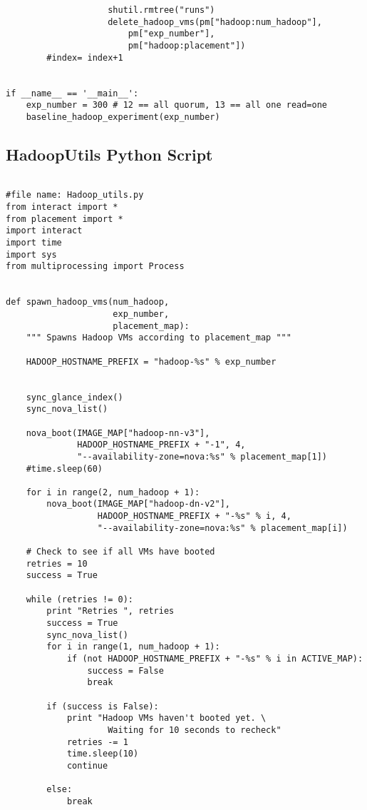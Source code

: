 \begin{verbatim}
                    shutil.rmtree("runs")
                    delete_hadoop_vms(pm["hadoop:num_hadoop"],
                        pm["exp_number"],
                        pm["hadoop:placement"])
        #index= index+1

 
if __name__ == '__main__':
    exp_number = 300 # 12 == all quorum, 13 == all one read=one
    baseline_hadoop_experiment(exp_number)

\end{verbatim}

\subsection{HadoopUtils Python Script}

\begin{verbatim}

#file name: Hadoop_utils.py
from interact import *
from placement import *
import interact
import time
import sys
from multiprocessing import Process


def spawn_hadoop_vms(num_hadoop,
                     exp_number,
                     placement_map):
    """ Spawns Hadoop VMs according to placement_map """

    HADOOP_HOSTNAME_PREFIX = "hadoop-%s" % exp_number


    sync_glance_index()
    sync_nova_list()

    nova_boot(IMAGE_MAP["hadoop-nn-v3"],
              HADOOP_HOSTNAME_PREFIX + "-1", 4,
              "--availability-zone=nova:%s" % placement_map[1])
    #time.sleep(60)

    for i in range(2, num_hadoop + 1):
        nova_boot(IMAGE_MAP["hadoop-dn-v2"],
                  HADOOP_HOSTNAME_PREFIX + "-%s" % i, 4,
                  "--availability-zone=nova:%s" % placement_map[i])

    # Check to see if all VMs have booted
    retries = 10
    success = True

    while (retries != 0):
        print "Retries ", retries
        success = True
        sync_nova_list()
        for i in range(1, num_hadoop + 1):
            if (not HADOOP_HOSTNAME_PREFIX + "-%s" % i in ACTIVE_MAP):
                success = False
                break

        if (success is False):
            print "Hadoop VMs haven't booted yet. \
                    Waiting for 10 seconds to recheck"
            retries -= 1
            time.sleep(10)
            continue

        else:
            break


\end{verbatim}
